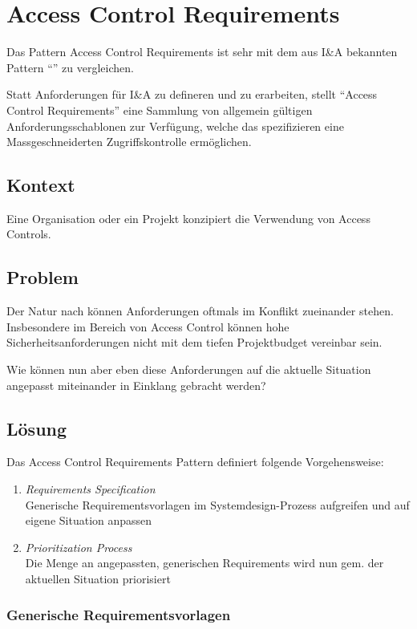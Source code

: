 \section{Access Control Requirements}

Das Pattern Access Control Requirements ist sehr mit dem aus I\&A bekannten Pattern ``'' zu vergleichen.

Statt Anforderungen für I\&A zu defineren und zu erarbeiten, stellt ``Access Control Requirements'' eine Sammlung von allgemein gültigen Anforderungsschablonen zur Verfügung, welche das spezifizieren eine Massgeschneiderten Zugriffskontrolle ermöglichen.


\subsection*{Kontext}
Eine Organisation oder ein Projekt konzipiert die Verwendung von Access Controls.

\subsection*{Problem}
Der Natur nach können Anforderungen oftmals im Konflikt zueinander stehen. Insbesondere im Bereich von Access Control können hohe Sicherheitsanforderungen nicht mit dem tiefen Projektbudget vereinbar sein.

Wie können nun aber eben diese Anforderungen auf die aktuelle Situation angepasst miteinander in Einklang gebracht werden?

\subsection*{Lösung}
Das Access Control Requirements Pattern definiert folgende Vorgehensweise:

\begin{enumerate}
	\item \emph{Requirements Specification}\\
	Generische Requirementsvorlagen im Systemdesign-Prozess aufgreifen und auf eigene Situation anpassen
	\item \emph{Prioritization Process}\\
	Die Menge an angepassten, generischen Requirements wird nun gem. der aktuellen Situation priorisiert
\end{enumerate}

\subsubsection*{Generische Requirementsvorlagen}

